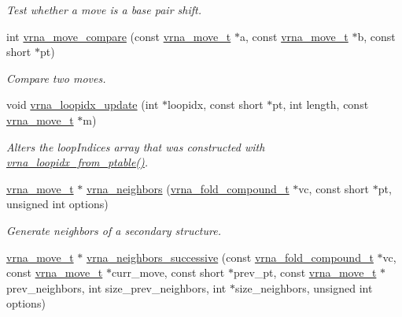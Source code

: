 \begin{DoxyCompactItemize}
\begin{DoxyCompactList}\small\item\em Test whether a move is a base pair shift. \end{DoxyCompactList}\item 
int \mbox{\hyperlink{group__neighbors_ga7aa139b99eec837e646973ffa23b6a9d}{vrna\+\_\+move\+\_\+compare}} (const \mbox{\hyperlink{group__neighbors_ga08630e00206cd163ea29c462bf5f4755}{vrna\+\_\+move\+\_\+t}} $\ast$a, const \mbox{\hyperlink{group__neighbors_ga08630e00206cd163ea29c462bf5f4755}{vrna\+\_\+move\+\_\+t}} $\ast$b, const short $\ast$pt)
\begin{DoxyCompactList}\small\item\em Compare two moves. \end{DoxyCompactList}\item 
void \mbox{\hyperlink{group__neighbors_ga5ceb55ee56494b1f5b7aaa758cb722d1}{vrna\+\_\+loopidx\+\_\+update}} (int $\ast$loopidx, const short $\ast$pt, int length, const \mbox{\hyperlink{group__neighbors_ga08630e00206cd163ea29c462bf5f4755}{vrna\+\_\+move\+\_\+t}} $\ast$m)
\begin{DoxyCompactList}\small\item\em Alters the loop\+Indices array that was constructed with \mbox{\hyperlink{group__struct__utils_ga03e15af299be0866ff21da880c74b92e}{vrna\+\_\+loopidx\+\_\+from\+\_\+ptable()}}. \end{DoxyCompactList}\item 
\mbox{\hyperlink{group__neighbors_ga08630e00206cd163ea29c462bf5f4755}{vrna\+\_\+move\+\_\+t}} $\ast$ \mbox{\hyperlink{group__neighbors_ga4f8eefae08c05f5a49a4d4ee5d02e32f}{vrna\+\_\+neighbors}} (\mbox{\hyperlink{group__fold__compound_ga1b0cef17fd40466cef5968eaeeff6166}{vrna\+\_\+fold\+\_\+compound\+\_\+t}} $\ast$vc, const short $\ast$pt, unsigned int options)
\begin{DoxyCompactList}\small\item\em Generate neighbors of a secondary structure. \end{DoxyCompactList}\item 
\mbox{\hyperlink{group__neighbors_ga08630e00206cd163ea29c462bf5f4755}{vrna\+\_\+move\+\_\+t}} $\ast$ \mbox{\hyperlink{group__neighbors_gae5aaa1c5a1f22e889843f3edbdd04714}{vrna\+\_\+neighbors\+\_\+successive}} (const \mbox{\hyperlink{group__fold__compound_ga1b0cef17fd40466cef5968eaeeff6166}{vrna\+\_\+fold\+\_\+compound\+\_\+t}} $\ast$vc, const \mbox{\hyperlink{group__neighbors_ga08630e00206cd163ea29c462bf5f4755}{vrna\+\_\+move\+\_\+t}} $\ast$curr\+\_\+move, const short $\ast$prev\+\_\+pt, const \mbox{\hyperlink{group__neighbors_ga08630e00206cd163ea29c462bf5f4755}{vrna\+\_\+move\+\_\+t}} $\ast$prev\+\_\+neighbors, int size\+\_\+prev\+\_\+neighbors, int $\ast$size\+\_\+neighbors, unsigned int options)

\end{DoxyCompactItemize}
